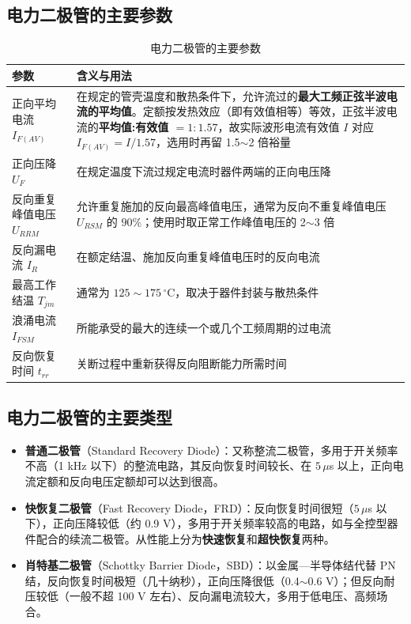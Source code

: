 \subsection{电力二极管的主要参数}

\begin{table}[htbp]
\centering
\caption{电力二极管的主要参数}
\label{tab:2-2}
\begin{tabular}{p{3.6cm}p{11.4cm}}
\toprule
\textbf{参数} & \textbf{含义与用法} \\
\midrule
正向平均电流 $I_{F(AV)}$ & 在规定的管壳温度和散热条件下，允许流过的\textbf{最大工频正弦半波电流的平均值}。定额按发热效应（即有效值相等）等效，正弦半波电流的\textbf{平均值:有效值 $=1:1.57$}，故实际波形电流有效值 $I$ 对应 $I_{F(AV)}=I/1.57$，选用时再留 1.5$\sim$2 倍裕量 \\
正向压降 $U_F$ & 在规定温度下流过规定电流时器件两端的正向电压降 \\
反向重复峰值电压 $U_{RRM}$ & 允许重复施加的反向最高峰值电压，通常为反向不重复峰值电压 $U_{RSM}$ 的 $90\%$；使用时取正常工作峰值电压的 2$\sim$3 倍 \\
反向漏电流 $I_R$ & 在额定结温、施加反向重复峰值电压时的反向电流 \\
最高工作结温 $T_{jm}$ & 通常为 $125\sim175\,^\circ$C，取决于器件封装与散热条件 \\
浪涌电流 $I_{FSM}$ & 所能承受的最大的连续一个或几个工频周期的过电流 \\
反向恢复时间 $t_{rr}$ & 关断过程中重新获得反向阻断能力所需时间 \\
\bottomrule
\end{tabular}
\end{table}

\subsection{电力二极管的主要类型}

\begin{itemize}
  \item \textbf{普通二极管}（Standard Recovery Diode）：又称整流二极管，多用于开关频率不高（1 kHz 以下）的整流电路，其反向恢复时间较长、在 $5\,\mu$s 以上，正向电流定额和反向电压定额却可以达到很高。
  \item \textbf{快恢复二极管}（Fast Recovery Diode，FRD）：反向恢复时间很短（$5\,\mu$s 以下），正向压降较低（约 0.9 V），多用于开关频率较高的电路，如与全控型器件配合的续流二极管。从性能上分为\textbf{快速恢复}和\textbf{超快恢复}两种。
  \item \textbf{肖特基二极管}（Schottky Barrier Diode，SBD）：以金属—半导体结代替 PN 结，反向恢复时间极短（几十纳秒），正向压降很低（0.4$\sim$0.6 V）；但反向耐压较低（一般不超 100 V 左右）、反向漏电流较大，多用于低电压、高频场合。
\end{itemize}

